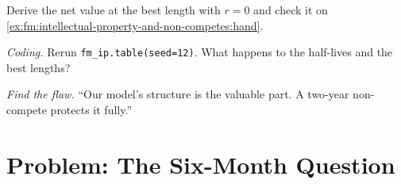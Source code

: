 \begin{exercise}[$\star\star$]\label{exo:fm:intellectual-property-and-non-competes:6}
Derive the net value at the best length with $r=0$ and check it on \cref{ex:fm:intellectual-property-and-non-competes:hand}.
\end{exercise}

\begin{exercise}[$\star\star\star$]\label{exo:fm:intellectual-property-and-non-competes:7}
\emph{Coding.} Rerun \texttt{fm\_ip.table(seed=12)}. What happens to the half-lives and the best lengths?
\end{exercise}

\begin{exercise}[$\star\star\star$]\label{exo:fm:intellectual-property-and-non-competes:8}
\emph{Find the flaw.} ``Our model's structure is the valuable part. A two-year non-compete protects it fully.''
\end{exercise}

\section{Problem: The Six-Month Question}

